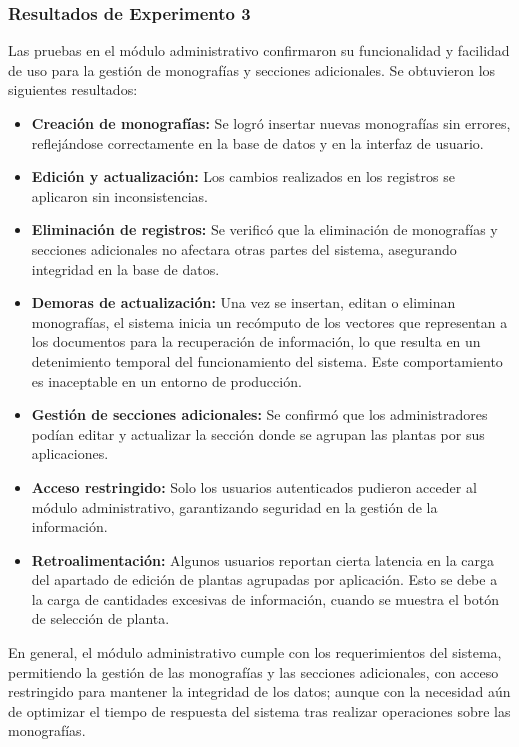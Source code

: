 \subsubsection*{Resultados de Experimento 3}
Las pruebas en el módulo administrativo confirmaron su funcionalidad y facilidad de uso para la gestión de monografías y secciones adicionales. 
Se obtuvieron los siguientes resultados:
\begin{itemize}
    \item \textbf{Creación de monografías:} Se logró insertar nuevas monografías sin errores, reflejándose correctamente en la base de datos 
    y en la interfaz de usuario.
    \item \textbf{Edición y actualización:} Los cambios realizados en los registros se aplicaron sin inconsistencias.
    \item \textbf{Eliminación de registros:} Se verificó que la eliminación de monografías y secciones adicionales no afectara otras partes 
    del sistema, asegurando integridad en la base de datos.
    \item \textbf{Demoras de actualización:} Una vez se insertan, editan o eliminan monografías, el sistema inicia un recómputo de los 
    vectores que representan a los documentos para la recuperación de información, lo que resulta en un detenimiento temporal del funcionamiento
    del sistema. Este comportamiento es inaceptable en un entorno de producción.
    \item \textbf{Gestión de secciones adicionales:} Se confirmó que los administradores podían editar y actualizar la sección donde se agrupan
    las plantas por sus aplicaciones.
    \item \textbf{Acceso restringido:} Solo los usuarios autenticados pudieron acceder al módulo administrativo, garantizando seguridad en la 
    gestión de la información.
    \item \textbf{Retroalimentación:} Algunos usuarios reportan cierta latencia en la carga del apartado de edición de plantas agrupadas por
    aplicación. Esto se debe a la carga de cantidades excesivas de información, cuando se muestra el botón de selección de planta.
\end{itemize}
En general, el módulo administrativo cumple con los requerimientos del sistema, permitiendo la gestión de las monografías y las secciones adicionales, 
con acceso restringido para mantener la integridad de los datos; aunque con la necesidad aún de optimizar el tiempo de respuesta del sistema tras
realizar operaciones sobre las monografías.
